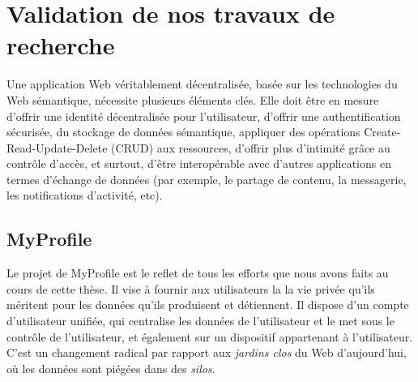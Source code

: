 \section*{Validation de nos travaux de recherche}
Une application Web véritablement décentralisée, basée sur les technologies du Web sémantique, nécessite plusieurs éléments clés. Elle doit être en mesure d'offrir une identité décentralisée pour l'utilisateur, d'offrir une authentification sécurisée, du stockage de données sémantique, appliquer des opérations Create-Read-Update-Delete (CRUD) aux ressources, d'offrir plus d'intimité grâce au contrôle d'accès, et surtout, d'être interopérable avec d'autres applications en termes d'échange de données (par exemple, le partage de contenu, la messagerie, les notifications d'activité, etc).

\subsection*{MyProfile}
Le projet de MyProfile est le reflet de tous les efforts que nous avons faits au cours de cette thèse. Il vise à fournir aux utilisateurs la la vie privée qu'ils méritent pour les données qu'ils produisent et détiennent. Il dispose d'un compte d'utilisateur unifiée, qui centralise les données de l'utilisateur et le met sous le contrôle de l'utilisateur, et également sur un dispositif appartenant à l'utilisateur. C'est un changement radical par rapport aux \textit{jardins clos} du Web d'aujourd'hui, où les données sont piégées dans des \textit{silos}.\\


